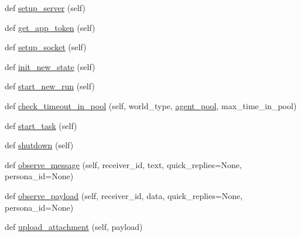 \begin{DoxyCompactItemize}
def \hyperlink{classparlai_1_1messenger_1_1core_1_1messenger__manager_1_1MessengerManager_a95f5de1ee4123af1ed3617ea6ac5ff13}{setup\+\_\+server} (self)
\item 
def \hyperlink{classparlai_1_1messenger_1_1core_1_1messenger__manager_1_1MessengerManager_a40189b28ba847731c4749cc6de05252c}{get\+\_\+app\+\_\+token} (self)
\item 
def \hyperlink{classparlai_1_1messenger_1_1core_1_1messenger__manager_1_1MessengerManager_a03a9a5d1adb91dae9e5ed1c4d5b70a5c}{setup\+\_\+socket} (self)
\item 
def \hyperlink{classparlai_1_1messenger_1_1core_1_1messenger__manager_1_1MessengerManager_a3222c094024dad56e029b584062bc5f6}{init\+\_\+new\+\_\+state} (self)
\item 
def \hyperlink{classparlai_1_1messenger_1_1core_1_1messenger__manager_1_1MessengerManager_ae5c31aa6bdd84bf70adabc204915cc3f}{start\+\_\+new\+\_\+run} (self)
\item 
def \hyperlink{classparlai_1_1messenger_1_1core_1_1messenger__manager_1_1MessengerManager_ac1f17ccc47844361a32ca3da63ae1c3e}{check\+\_\+timeout\+\_\+in\+\_\+pool} (self, world\+\_\+type, \hyperlink{classparlai_1_1messenger_1_1core_1_1messenger__manager_1_1MessengerManager_a8913036d1cbffd57543a63b0f48c9c0e}{agent\+\_\+pool}, max\+\_\+time\+\_\+in\+\_\+pool)
\item 
def \hyperlink{classparlai_1_1messenger_1_1core_1_1messenger__manager_1_1MessengerManager_a8bf1afcc5ef1546f32a7ad0d390d0fe1}{start\+\_\+task} (self)
\item 
def \hyperlink{classparlai_1_1messenger_1_1core_1_1messenger__manager_1_1MessengerManager_a0f7434630ba27fbcc4e35650ec472099}{shutdown} (self)
\item 
def \hyperlink{classparlai_1_1messenger_1_1core_1_1messenger__manager_1_1MessengerManager_a71506a682b9284d8ae4121576e6140db}{observe\+\_\+message} (self, receiver\+\_\+id, text, quick\+\_\+replies=None, persona\+\_\+id=None)
\item 
def \hyperlink{classparlai_1_1messenger_1_1core_1_1messenger__manager_1_1MessengerManager_a6fd0d7046fe2c86064cc8abdd0d45077}{observe\+\_\+payload} (self, receiver\+\_\+id, data, quick\+\_\+replies=None, persona\+\_\+id=None)
\item 
def \hyperlink{classparlai_1_1messenger_1_1core_1_1messenger__manager_1_1MessengerManager_ab98d837cddfda4903d5670e06be5a743}{upload\+\_\+attachment} (self, payload)
\end{DoxyCompactItemize}
